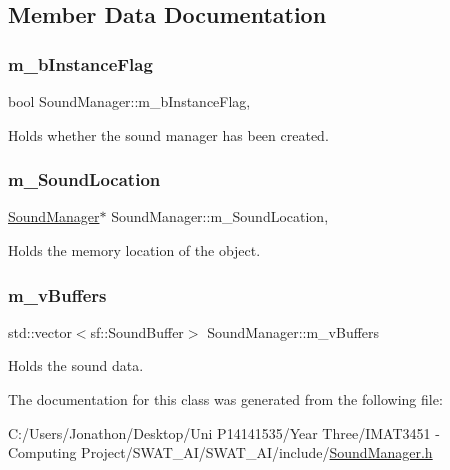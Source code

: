 \subsection{Member Data Documentation}
\mbox{\label{class_sound_manager_aaa20c7fb691b35169bda8f6bb5332b78}} 
\subsubsection{\texorpdfstring{m\+\_\+b\+Instance\+Flag}{m\_bInstanceFlag}}
{\footnotesize\ttfamily bool Sound\+Manager\+::m\+\_\+b\+Instance\+Flag\hspace{0.3cm}{\ttfamily [static]}, {\ttfamily [private]}}



Holds whether the sound manager has been created. 

\mbox{\label{class_sound_manager_a2917e26757921e604323c90b7a88fce3}} 
\subsubsection{\texorpdfstring{m\+\_\+\+Sound\+Location}{m\_SoundLocation}}
{\footnotesize\ttfamily \hyperlink{class_sound_manager}{Sound\+Manager}$\ast$ Sound\+Manager\+::m\+\_\+\+Sound\+Location\hspace{0.3cm}{\ttfamily [static]}, {\ttfamily [private]}}



Holds the memory location of the object. 

\mbox{\label{class_sound_manager_a078a8ded7496de333a579540b7c5024f}} 
\subsubsection{\texorpdfstring{m\+\_\+v\+Buffers}{m\_vBuffers}}
{\footnotesize\ttfamily std\+::vector$<$sf\+::\+Sound\+Buffer$>$ Sound\+Manager\+::m\+\_\+v\+Buffers\hspace{0.3cm}{\ttfamily [private]}}



Holds the sound data. 



The documentation for this class was generated from the following file\+:\begin{DoxyCompactItemize}
\item 
C\+:/\+Users/\+Jonathon/\+Desktop/\+Uni P14141535/\+Year Three/\+I\+M\+A\+T3451 -\/ Computing Project/\+S\+W\+A\+T\+\_\+\+A\+I/\+S\+W\+A\+T\+\_\+\+A\+I/include/\hyperlink{_sound_manager_8h}{Sound\+Manager.\+h}\end{DoxyCompactItemize}

